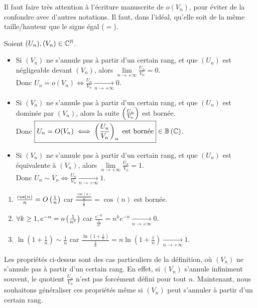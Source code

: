 \documentclass[12pt, a4paper]{report}
\begin{document}
\begin{remark}
    Il faut faire très attention à l'écriture manuscrite de $o(V_n)$, pour éviter de la confondre avec d'autres notations. Il faut, dans l'idéal, qu'elle soit de la même taille/hauteur que le signe égal ($=$).
\end{remark}

\begin{property}
    Soient $(U_n),(V_n)\in\mathbb{C}^{\mathbb{N}}$.
    \begin{itemize}
        \item Si $(V_n)$ ne s'annule pas à partir d'un certain rang, et que $(U_n)$ est négligeable devant $(V_n)$, alors $\lim\limits_{n\to+\infty} \frac{U_n}{V_n} = 0$.\\Donc $\boxed{U_n=o(V_n) \iff \frac{U_n}{V_n} \xrightarrow[n\to+\infty]{} 0}$.
        \item Si $(V_n)$ ne s'annule pas à partir d'un certain rang, et que $(U_n)$ est dominée par $(V_n)$, alors la suite $\left(\frac{U_n}{V_n}\right)$ est bornée.\\Donc $\boxed{U_n=O(V_n) \iff \left(\frac{U_n}{V_n}\right)_n \text{ est bornée}} \in \mathbb{B}\left(\mathbb{C}\right)$.
        \item Si $(V_n)$ ne s'annule pas à partir d'un certain rang, et que $(U_n)$ est équivalente à $(V_n)$, alors $\lim\limits_{n\to+\infty} \frac{U_n}{V_n} = 1$.\\Donc $\boxed{U_n \sim V_n \iff \frac{U_n}{V_n} \xrightarrow[n\to+\infty]{} 1}$.
    \end{itemize}
\end{property}

\begin{example}
    \begin{enumerate}
        \item $\frac{\cos(n)}{n}=O\left(\frac{1}{n}\right)$ car $\frac{\frac{\cos(n)}{n}}{\frac{1}{n}} = \cos(n)$ est bornée.
        \item $\forall k \ge 1, e^{-n} = o\left(\frac{1}{n^k}\right)$ car $\frac{e^{-n}}{\frac{1}{n^k}} = n^k e^{-n} \xrightarrow[n\to+\infty]{} 0$.
        \item $\ln(1+\frac1n) \sim \frac1n$ car $\frac{\ln(1+\frac1n)}{\frac1n} = n\ln(1+\frac1n) \xrightarrow[n\to+\infty]{} 1$.
    \end{enumerate}
\end{example}

Les propriétés ci-dessus sont des cas particuliers de la définition, où $(V_n)$ ne s'annule pas à partir d'un certain rang. En effet, si $(V_n)$ s'annule infiniment souvent, le quotient $\frac{U_n}{V_n}$ n'est pas forcément défini pour tout $n$. Maintenant, nous souhaitons généraliser ces propriétés même si $(V_n)$ peut s'annuler à partir d'un certain rang.
\end{document}
